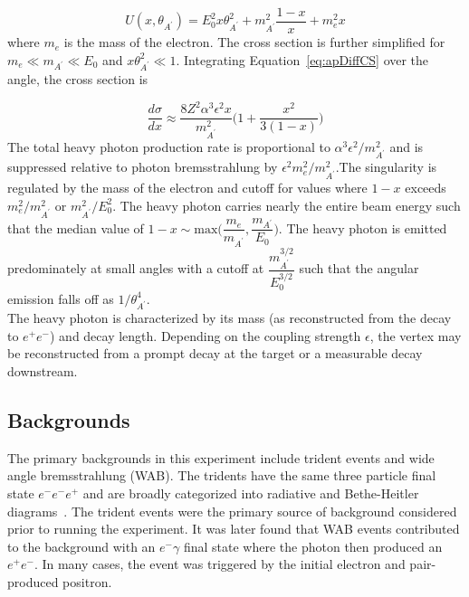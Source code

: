 \begin{equation}
	\label{eq:virtuality}
	U(x,\theta_{A^{\prime}}) = E_0^2x\theta_{A^{\prime}}^2+m_{A^{\prime}}^2\dfrac{1-x}{x}+m_e^2x 
\end{equation}
where $m_e$ is the mass of the electron. The cross section is further simplified for $m_e\ll m_{A^{\prime}}\ll E_0$ and $x\theta_{A^{\prime}}^2\ll 1$. Integrating Equation~\eqref{eq:apDiffCS} over the angle, the cross section is

\begin{equation}
	\label{eq:csFinal}
	\dfrac{d\sigma}{dx} \approx \dfrac{8Z^2\alpha^3\epsilon^2x}{m_{A^{\prime}}^2}\Big(1+\dfrac{x^2}{3(1-x)}\Big)
\end{equation}
The total heavy photon production rate is proportional to $\alpha^3\epsilon^2/m_{A^{\prime}}^2$ and is suppressed relative to photon bremsstrahlung by $\epsilon^2m_e^2/m_{A^{\prime}}^2$.The singularity is regulated by the mass of the electron and cutoff for values where $1-x$ exceeds $m_e^2/m_{A^{\prime}}^2$ or $m_{A^{\prime}}^2/E_0^2$. The heavy photon carries nearly the entire beam energy such that the median value of $1-x\sim\textrm{max}\Big(\dfrac{m_e}{m_{A^{\prime}}}, \dfrac{m_{A^{\prime}}}{E_0}\Big)$. The heavy photon is emitted predominately at small angles with a cutoff at $\dfrac{m_{A^{\prime}}^{3/2}}{E_0^{3/2}}$ such that the angular emission falls off as $1/\theta_{A^{\prime}}^4$.\\
 \indent The heavy photon is characterized by its mass (as reconstructed from the decay to $e^+e^-$) and decay length. Depending on the coupling strength $\epsilon$, the vertex may be reconstructed from a prompt decay at the target or a measurable decay downstream.  

\subsection{Backgrounds}

The primary backgrounds in this experiment include trident events and wide angle bremsstrahlung (WAB). The tridents have the same three particle final state $e^-e^-e^+$ and are broadly categorized into radiative and Bethe-Heitler diagrams~\cite{bjorken_new_2009}. The trident events were the primary source of background considered prior to running the experiment. It was later found that WAB events contributed to the background with an $e^-\gamma$ final state where the photon then produced an $e^+e^-$. In many cases, the event was triggered by the initial electron and pair-produced positron. 

